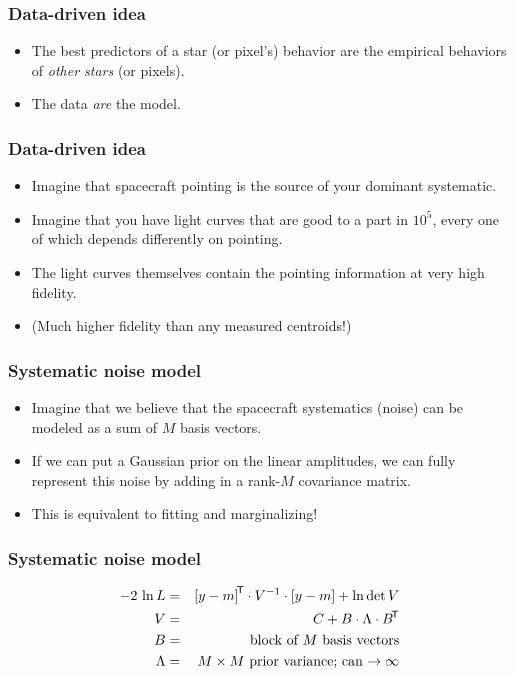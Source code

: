 \documentclass[pdftex]{beamer}
\begin{document}
\begin{frame}
  \frametitle{Data-driven idea}
  \begin{itemize}
  \item The best predictors of a star (or pixel's) behavior are the
    empirical behaviors of \emph{other stars} (or pixels).
  \item The data \emph{are} the model.
  \end{itemize}
\end{frame}

\begin{frame}
  \frametitle{Data-driven idea}
  \begin{itemize}
  \item Imagine that spacecraft pointing is the source of your
    dominant systematic.
  \item Imagine that you have light curves that are good to a part in
    $10^5$, every one of which depends differently on pointing.
  \item The light curves themselves contain the pointing information
    at very high fidelity.
  \item (Much higher fidelity than any measured centroids!)
  \end{itemize}
\end{frame}

\begin{frame}
  \frametitle{Systematic noise model}
  \begin{itemize}
  \item Imagine that we believe that the spacecraft systematics
    (noise) can be modeled as a sum of $M$ basis vectors.
  \item If we can put a Gaussian prior on the linear amplitudes, we
    can fully represent this noise by adding in a rank-$M$ covariance
    matrix.
  \item This is equivalent to fitting and marginalizing!
  \end{itemize}
\end{frame}

\begin{frame}
  \frametitle{Systematic noise model}
  \begin{eqnarray}
    -2\,\ln L &=& {[y - m]}^{\mathsf{\!T}}\cdot V^{-1}\cdot [y - m] + \ln\det V
    \nonumber \\
    V &=& C + B\cdot\Lambda\cdot{B}^{\mathsf{\!T}}
    \nonumber \\
    B &=& \mbox{block of $M$ basis vectors}
    \nonumber \\
    \Lambda &=& \mbox{$M\times M$ prior variance; can $\rightarrow\infty$}
    \nonumber
  \end{eqnarray}
\end{frame}
\end{document}
